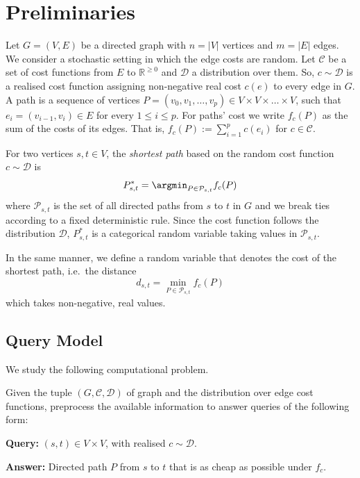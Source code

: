 \section{Preliminaries}
\label{sec:prelim}

Let $G = (V, E)$ be a directed graph with $n = |V|$ vertices and $m = |E|$ edges. We consider a stochastic setting in which the edge costs are random. Let $\mathcal C$ be a set of cost functions from $E$ to $\mathbb R^{\ge 0}$ and $\mathcal D$ a distribution over them. So, $c \sim \mathcal D$ is a realised cost function assigning non-negative real cost $c(e)$ to every edge in $G$.
A path is a sequence of vertices $P = (v_0, v_1, \dots, v_p) \in V \times V \times \dots \times V$, such that $e_i = (v_{i-1}, v_i) \in E$ for every $1\le i\le p$. For paths' cost we write $f_c(P)$ as the sum of the costs of its edges. That is, $f_c(P) := \sum_{i = 1}^p c(e_i)$ for $c \in \mathcal C$.

For two vertices $s, t \in V$, the \emph{shortest path} based on the random cost function $c \sim \mathcal D$ is
\[
P^*_{s,t} = \argmin_{P \in \mathcal{P}_{s,t}} f_c(P)
\]
where $\mathcal{P}_{s,t}$ is the set of all directed paths from $s$ to $t$ in $G$ and we break ties according to a fixed deterministic rule.
Since the cost function follows the distribution $\mathcal D$, $P^*_{s,t}$ is a categorical random variable taking values in $\mathcal{P}_{s,t}$.

In the same manner, we define a random variable that denotes the cost of the shortest path, i.e.~the distance
\[
d_{s,t} = \min_{P \in \mathcal{P}_{s,t}} f_c(P)
\]
which takes non-negative, real values.

\subsection{Query Model}

We study the following computational problem.

\begin{problem}
\label{prob:shortest-path}
Given the tuple $(G, \mathcal C, \mathcal D)$ of graph and the distribution over edge cost functions, preprocess the available information to answer queries of the following form:

\textbf{Query:} $(s, t) \in V\times V$, with realised $c \sim \mathcal D$.

\textbf{Answer:} Directed path $P$ from $s$ to $t$ that is as cheap as possible under $f_c$.
\end{problem}

